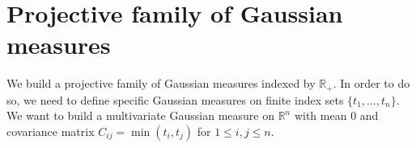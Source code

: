 \section{Projective family of Gaussian measures}

We build a projective family of Gaussian measures indexed by $\mathbb{R}_+$.
In order to do so, we need to define specific Gaussian measures on finite index sets $\{t_1, \ldots, t_n\}$.
We want to build a multivariate Gaussian measure on $\mathbb{R}^n$ with mean $0$ and covariance matrix $C_{ij} = \min(t_i, t_j)$ for $1 \leq i,j \leq n$.








